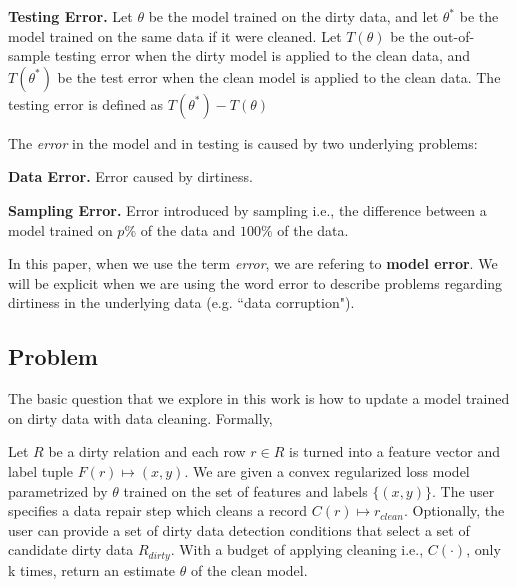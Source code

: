 \noindent\textbf{Testing Error. } Let $\theta$ be the model trained on the dirty data, and let $\theta^*$ be the model trained on the same data if it were cleaned. Let $T(\theta)$ be the out-of-sample testing error when the dirty model is applied to the clean data, and $T(\theta^*)$ be the test error when the clean model is applied to the clean data. The testing error is defined as $T(\theta^*) - T(\theta)$

\vspace{0.5em}

\noindent The \emph{error} in the model and in testing is caused by two underlying problems:

\vspace{0.5em}

\noindent\textbf{Data Error. } Error caused by dirtiness.

\vspace{0.5em}

\noindent\textbf{Sampling Error. } Error introduced by sampling i.e., the difference between a model trained on $p\%$ of the data and $100\%$ of the data.

\vspace{0.5em}

In this paper, when we use the term \emph{error}, we are refering to \textbf{model error}.
We will be explicit when we are using the word error to describe problems regarding dirtiness in the underlying data (e.g. ``data corruption").

\subsection{\sys Problem}
The basic question that we explore in this work is how to update a model trained on dirty data with data cleaning. Formally,

\begin{problem}\label{activeclean}\sloppy
Let $R$ be a dirty relation and each row $r \in R$ is 
turned into a feature vector and label tuple $F(r) \mapsto (x,y)$.
We are given a convex regularized loss model parametrized
by $\theta$ trained on the set of features and labels $\{(x,y)\}$.
The user specifies a data repair step which cleans a record 
$C(r) \mapsto r_{clean}$.
Optionally, the user can provide a set of dirty data detection conditions that select 
a set of candidate dirty data $R_{dirty}$.
With a budget of applying cleaning i.e., $C(\cdot)$, only k times, return an estimate $\hat{\theta}$ of the clean model.
\end{problem}

